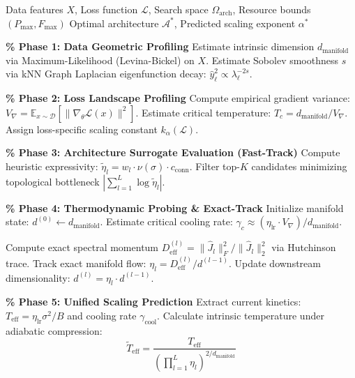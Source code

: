 \documentclass[11pt, a4paper]{article}
\theoremstyle{definition}
\begin{document}
\begin{algorithm}[htbp]
\caption{Thermogeometric Architecture Search (TAS) Pipeline}
\label{alg:tas-pipeline}
\begin{algorithmic}[1]
\REQUIRE Data features $X$, Loss function $\mathcal{L}$, Search space $\Omega_{\text{arch}}$, Resource bounds $(P_{\max}, F_{\max})$
\ENSURE Optimal architecture $\mathcal{A}^*$, Predicted scaling exponent $\alpha^*$

\STATE \textbf{\% Phase 1: Data Geometric Profiling}
\STATE Estimate intrinsic dimension $d_{\text{manifold}}$ via Maximum-Likelihood (Levina-Bickel) on $X$.
\STATE Estimate Sobolev smoothness $s$ via kNN Graph Laplacian eigenfunction decay: $\hat{y}_\ell^2 \propto \lambda_\ell^{-2s}$.

\STATE \textbf{\% Phase 2: Loss Landscape Profiling}
\STATE Compute empirical gradient variance: $V_{\nabla} = \mathbb{E}_{x \sim \mathcal{D}} [\|\nabla_\theta \mathcal{L}(x)\|^2]$.
\STATE Estimate critical temperature: $T_c = d_{\text{manifold}} / V_{\nabla}$.
\STATE Assign loss-specific scaling constant $k_\alpha(\mathcal{L})$.

\STATE \textbf{\% Phase 3: Architecture Surrogate Evaluation (Fast-Track)}
 \STATE Compute heuristic expressivity: $\tilde{\eta}_l = w_l \cdot \nu(\sigma) \cdot c_{\text{conn}}$.
 \STATE Filter top-$K$ candidates minimizing topological bottleneck $|\sum_{l=1}^L \log \tilde{\eta}_l|$.
\ENDFOR

\STATE \textbf{\% Phase 4: Thermodynamic Probing \& Exact-Track}
 \STATE Initialize manifold state: $d^{(0)} \leftarrow d_{\text{manifold}}$.
 \STATE Estimate critical cooling rate: $\gamma_c \approx (\eta_{\text{lr}} \cdot V_{\nabla}) / d_{\text{manifold}}$.
 
 \STATE Compute exact spectral momentum $D_{\text{eff}}^{(l)} = \|\hat{J}_l\|_F^2 / \|\hat{J}_l\|_2^2$ via Hutchinson trace.
 \STATE Track exact manifold flow: $\eta_l = D_{\text{eff}}^{(l)} / d^{(l-1)}$.
 \STATE Update downstream dimensionality: $d^{(l)} = \eta_l \cdot d^{(l-1)}$.
 \ENDFOR
 
 \STATE \textbf{\% Phase 5: Unified Scaling Prediction}
 \STATE Extract current kinetics: $T_{\text{eff}} = \eta_{\text{lr}}\sigma^2/B$ and cooling rate $\gamma_{\text{cool}}$.
 \STATE Calculate intrinsic temperature under adiabatic compression: 
 \[ \tilde{T}_{\text{eff}} = \frac{T_{\text{eff}}}{(\prod_{l=1}^L \eta_l)^{2/d_{\text{manifold}}}} \]
 

\end{algorithmic}
\end{algorithm}
\end{document}
